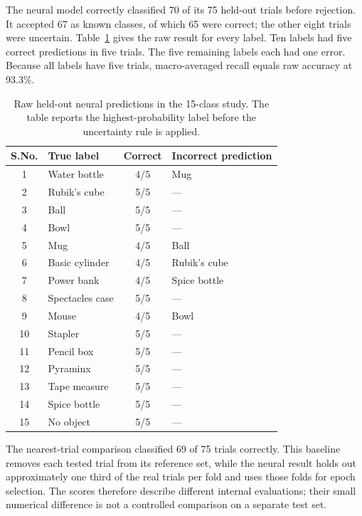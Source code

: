 \documentclass[authoryear,12pt]{elsarticle}
\begin{document}
The neural model correctly classified 70 of its 75
held-out trials before rejection. It accepted 67 as
known classes, of which 65 were correct; the other eight
trials were uncertain. Table~\ref{tab:perclass} gives
the raw result for every label. Ten labels
had five correct predictions in five trials. The five
remaining labels each had one error. Because all labels
have five trials, macro-averaged recall equals raw
accuracy at 93.3\%.

\begin{table}[H]
\centering
\caption{Raw held-out neural predictions in the 15-class
study. The table reports the highest-probability label
before the uncertainty rule is applied. \\}
\label{tab:perclass}
\small
\begin{tabular}{|c|l|c|l|}
\hline
S.No. & True label & Correct & Incorrect prediction \\
\hline
1 & Water bottle & 4/5 & Mug \\
2 & Rubik's cube & 5/5 & --- \\
3 & Ball & 5/5 & --- \\
4 & Bowl & 5/5 & --- \\
5 & Mug & 4/5 & Ball \\
6 & Basic cylinder & 4/5 & Rubik's cube \\
7 & Power bank & 4/5 & Spice bottle \\
8 & Spectacles case & 5/5 & --- \\
9 & Mouse & 4/5 & Bowl \\
10 & Stapler & 5/5 & --- \\
11 & Pencil box & 5/5 & --- \\
12 & Pyraminx & 5/5 & --- \\
13 & Tape measure & 5/5 & --- \\
14 & Spice bottle & 5/5 & --- \\
15 & No object & 5/5 & --- \\
\hline
\end{tabular}
\end{table}

The nearest-trial comparison classified 69 of 75 trials
correctly. This baseline removes each tested trial
from its reference set, while the neural result holds out
approximately one third of the real trials per fold and
uses those folds for epoch selection. The scores therefore
describe different internal evaluations; their small
numerical difference is not a controlled comparison
on a separate test set.
\end{document}
